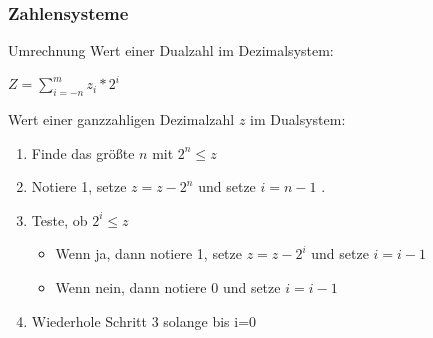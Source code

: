 \begin{frame}
	\frametitle{Zahlensysteme}
	\begin{block}{Umrechnung}
		\only<3->{\scriptsize}
		Wert einer Dualzahl im Dezimalsystem:
\begin{center}
	$Z=\sum_{i=-n}^{m} z_i * 2^i$
\end{center} \pause
		Wert einer ganzzahligen Dezimalzahl $z$ im Dualsystem:
			\begin{enumerate}
				\item Finde das größte $n$ mit $2^n \leq z$
				\item Notiere 1, setze $z=z-2^n$ und setze $i=n-1$ .
				\item Teste, ob $2^{i} \leq z$
					\begin{itemize}
						\item Wenn ja, dann notiere 1, setze $z=z-2^i$ und setze $i=i-1$
						\item Wenn nein, dann notiere 0 und setze $i=i-1$
					\end{itemize}
				\item Wiederhole Schritt 3 solange bis i=0
			\end{enumerate}
	\end{block}

\end{frame}


